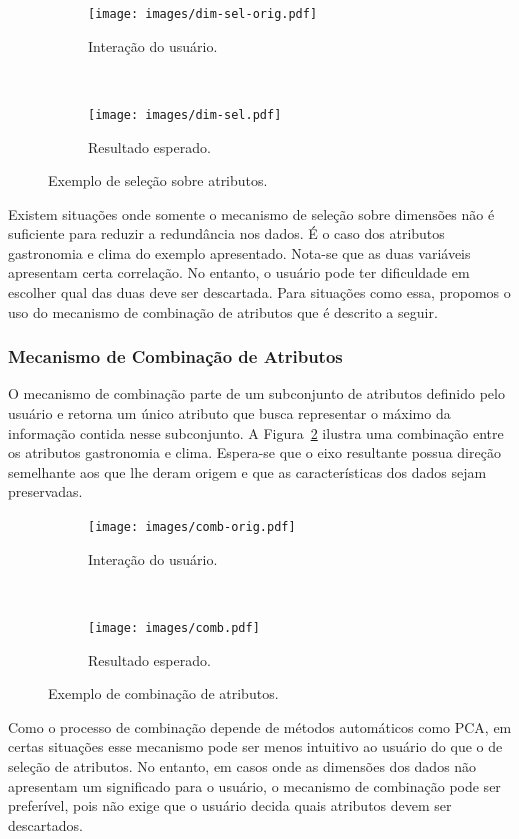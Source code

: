 \begin{figure}[h!]
  \centering
  \begin{subfigure}[b]{0.45\textwidth}
    \centering
    \texttt{[image: images/dim-sel-orig.pdf]}
    \caption{Interação do usuário.}
  \end{subfigure}%
  ~
  \begin{subfigure}[b]{0.45\textwidth}
    \centering
    \texttt{[image: images/dim-sel.pdf]}
    \caption{Resultado esperado.}
  \end{subfigure} 
  \caption{Exemplo de seleção sobre atributos.}
  \label{fig:item-sel}
\end{figure}

Existem situações onde somente o mecanismo de seleção sobre
dimensões não é suficiente para reduzir a redundância nos
dados. É o caso dos atributos gastronomia e clima do exemplo
apresentado. Nota-se que as duas variáveis apresentam certa
correlação. No entanto, o usuário pode ter dificuldade em
escolher qual das duas deve ser descartada. Para situações
como essa, propomos o uso do mecanismo de combinação de
atributos que é descrito a seguir.

\subsubsection{Mecanismo de Combinação de Atributos}

O mecanismo de combinação parte de um subconjunto de atributos
definido pelo usuário e retorna um único atributo que busca
representar o máximo da informação contida nesse subconjunto. A
Figura~\ref{fig:comb} ilustra uma combinação entre os atributos
gastronomia e clima. Espera-se que o eixo resultante possua 
direção semelhante aos que lhe deram origem e que as
características dos dados sejam preservadas.

\begin{figure}[h!]
  \centering
  \begin{subfigure}[b]{0.45\textwidth}
    \centering
    \texttt{[image: images/comb-orig.pdf]}
    \caption{Interação do usuário.}
  \end{subfigure}%
  ~
  \begin{subfigure}[b]{0.45\textwidth}
    \centering
    \texttt{[image: images/comb.pdf]}
    \caption{Resultado esperado.}
  \end{subfigure} 
  \caption{Exemplo de combinação de atributos.}
  \label{fig:comb}
\end{figure}

Como o processo de combinação depende de métodos automáticos
como PCA, em certas situações esse mecanismo pode ser menos
intuitivo ao usuário do que o de seleção de atributos. No
entanto, em casos onde as dimensões dos dados não apresentam
um significado para o usuário, o mecanismo de
combinação pode ser preferível, pois não exige que o usuário
decida quais atributos devem ser descartados.

